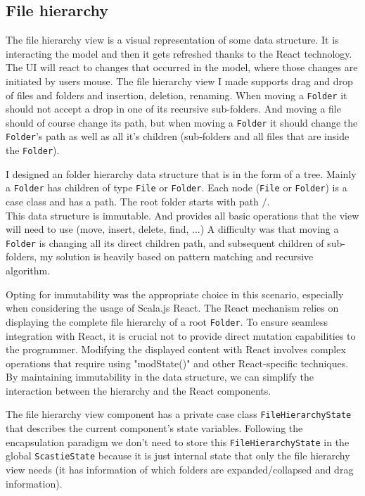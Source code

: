 \documentclass[a4paper,11pt,oneside]{report}
\begin{document}
\newpage

\subsection{File hierarchy}
The file hierarchy view is a visual representation of some data structure. It is interacting the model and then it gets refreshed thanks to the React technology. The UI will react to changes that occurred in the model, where those changes are initiated by users mouse. The file hierarchy view I made supports drag and drop of files and folders and insertion, deletion, renaming. 
When moving a \lstinline{Folder} it should not accept a drop in one of its recursive sub-folders. And moving a file should of course change its path, but when moving a \lstinline{Folder} it should change the \lstinline{Folder}'s path as well as all it's children (sub-folders and all files that are inside the \lstinline{Folder}).

I designed an folder hierarchy data structure that is in the form of a tree. Mainly a \lstinline{Folder} has children of type \lstinline{File} or \lstinline{Folder}. Each node (\lstinline{File} or \lstinline{Folder}) is a case class and has a path. The root folder starts with path $/$.\\
This data structure is immutable. And provides all basic operations that the view will need to use (move, insert, delete, find, ...)
A difficulty was that moving a \lstinline{Folder} is changing all its direct children path, and subsequent children of sub-folders, my solution is heavily based on pattern matching and recursive algorithm.

Opting for immutability was the appropriate choice in this scenario, especially when considering the usage of Scala.js React. The React mechanism relies on displaying the complete file hierarchy of a root \lstinline{Folder}. To ensure seamless integration with React, it is crucial not to provide direct mutation capabilities to the programmer. Modifying the displayed content with React involves complex operations that require using "modState()" and other React-specific techniques. By maintaining immutability in the data structure, we can simplify the interaction between the hierarchy and the React components.

The file hierarchy view component has a private case class \lstinline{FileHierarchyState} that describes the current component's state variables. Following the encapsulation paradigm we don't need to store this \lstinline{FileHierarchyState} in the global \lstinline{ScastieState} because it is just internal state that only the file hierarchy view needs (it has  information of which folders are expanded/collapsed and drag information).
\end{document}
